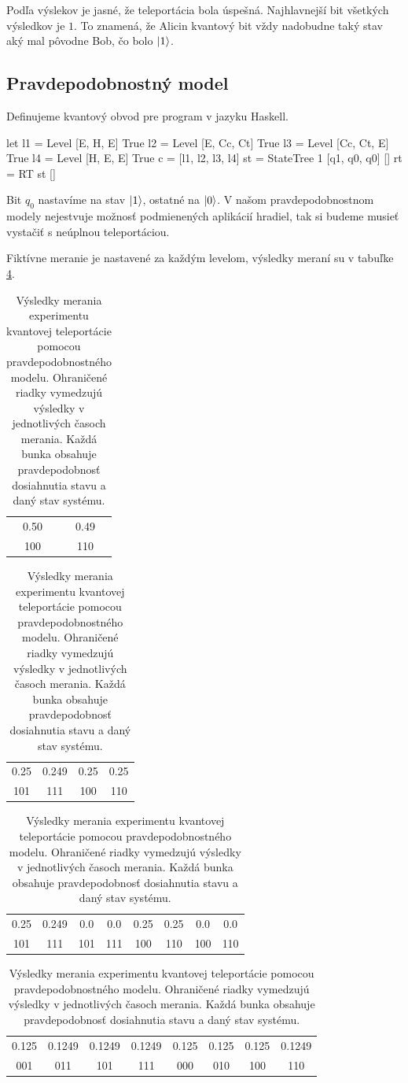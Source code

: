 Podľa výslekov je jasné, že teleportácia bola úspešná. Najhlavnejší bit 
všetkých výsledkov je \(1\). To znamená, že Alicin kvantový bit vždy nadobudne
taký stav aký mal pôvodne Bob, čo bolo \(\ket{1}\).

\subsection*{Pravdepodobnostný model}
Definujeme kvantový obvod pre program v jazyku Haskell.

\begin{code}
let l1 = Level [E, H, E] True
    l2 = Level [E, Cc, Ct] True
    l3 = Level [Cc, Ct, E] True
    l4 = Level [H, E, E] True
    c = [l1, l2, l3, l4]
    st = StateTree 1 [q1, q0, q0] []
    rt = RT st []
\end{code}
   
Bit \(q_0\) nastavíme na stav \(\ket{1}\), ostatné na \(\ket{0}\). V našom
pravdepodobnostnom modely nejestvuje možnosť podmienených aplikácií hradiel,
tak si budeme musieť vystačiť s neúplnou teleportáciou.

Fiktívne meranie je nastavené za každým levelom, výsledky meraní su v tabuľke
\ref{tel_results}.

\begin{table}
\centering

\begin{tabular}{|c|c|}
\hline
0.50 & 0.49 \\ 
100 & 110 \\ 
\hline
\end{tabular}

\begin{tabular}{|c|c|c|c|}
\hline
0.25 & 0.249 & 0.25 & 0.25 \\ 
101 & 111 & 100 & 110 \\ 
\hline
\end{tabular}

\begin{tabular}{|c|c|c|c|c|c|c|c|}
\hline
0.25 & 0.249 & 0.0 & 0.0 & 0.25 & 0.25 & 0.0 & 0.0 \\ 
101 & 111 & 101 & 111 & 100 & 110 & 100 & 110 \\ 
\hline
\end{tabular}

\begin{tabular}{|c|c|c|c|c|c|c|c|}
\hline
0.125 & 0.1249 & 0.1249 & 0.1249 & 0.125 & 0.125 & 0.125 & 0.1249 \\ 
001 & 011 & 101 & 111 & 000 & 010 & 100 & 110 \\ 
\hline
\end{tabular}

\caption{\label{tel_results} Výsledky merania experimentu kvantovej
teleportácie pomocou
pravdepodobnostného modelu. Ohraničené riadky vymedzujú výsledky v jednotlivých
 časoch merania. Každá bunka obsahuje pravdepodobnosť dosiahnutia stavu a 
daný stav systému.}
\end{table}

